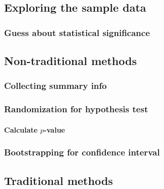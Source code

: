 \documentclass[12pt, krantz2,]{krantz}
\let\oldparagraph\paragraph
\renewcommand{\paragraph}[1]{\oldparagraph{#1}\mbox{}}
\begin{document}
\hypertarget{exploring-the-sample-data-2}{%
\subsection{Exploring the sample data}\label{exploring-the-sample-data-2}}

\hypertarget{guess-about-statistical-significance-2}{%
\subsubsection*{Guess about statistical significance}\label{guess-about-statistical-significance-2}}


\hypertarget{non-traditional-methods-2}{%
\subsection{Non-traditional methods}\label{non-traditional-methods-2}}

\hypertarget{collecting-summary-info}{%
\subsubsection*{Collecting summary info}\label{collecting-summary-info}}


\hypertarget{randomization-for-hypothesis-test}{%
\subsubsection*{Randomization for hypothesis test}\label{randomization-for-hypothesis-test}}


\hypertarget{calculate-p-value-2}{%
\paragraph{\texorpdfstring{Calculate \(p\)-value}{Calculate p-value}}\label{calculate-p-value-2}}

\hypertarget{bootstrapping-for-confidence-interval-2}{%
\subsubsection*{Bootstrapping for confidence interval}\label{bootstrapping-for-confidence-interval-2}}


\hypertarget{traditional-methods-2}{%
\subsection{Traditional methods}\label{traditional-methods-2}}
\end{document}
